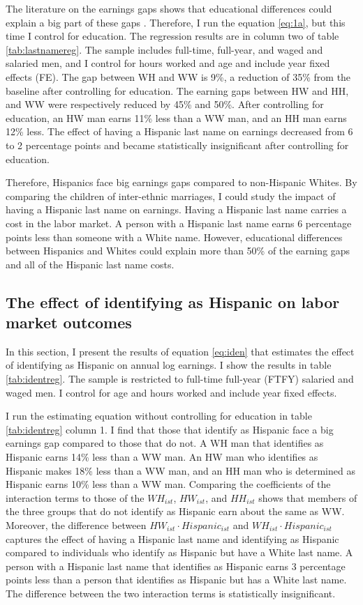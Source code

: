 \documentclass{wptemp}
\begin{document}
The literature on the earnings gaps shows that educational differences could explain a big part of these gaps \citep{duncan2006hispanics, duncan2017complexity, duncan2018identifying, duncan2020new}. Therefore, I run the equation \ref{eq:1a}, but this time I control for education. The regression results are in column two of table \ref{tab:lastnamereg}. The sample includes full-time, full-year, and waged and salaried men, and I control for hours worked and age and include year fixed effects (FE). The gap between WH and WW is 9\%, a reduction of 35\% from the baseline after controlling for education. The earning gaps between HW and HH, and WW were respectively reduced by 45\% and 50\%. After controlling for education, an HW man earns 11\% less than a WW man, and an HH man earns 12\% less. The effect of having a Hispanic last name on earnings decreased from 6 to 2 percentage points and became statistically insignificant after controlling for education.

Therefore, Hispanics face big earnings gaps compared to non-Hispanic Whites. By comparing the children of inter-ethnic marriages, I could study the impact of having a Hispanic last name on earnings. Having a Hispanic last name carries a cost in the labor market. A person with a Hispanic last name earns 6 percentage points less than someone with a White name. However, educational differences between Hispanics and Whites could explain more than 50\% of the earning gaps and all of the Hispanic last name costs.

\subsection{The effect of identifying as Hispanic on labor market outcomes}

In this section, I present the results of equation \ref{eq:iden} that estimates the effect of identifying as Hispanic on annual log earnings. I show the results in table \ref{tab:identreg}. The sample is restricted to full-time full-year (FTFY) salaried and waged men. I control for age and hours worked and include year fixed effects.

I run the estimating equation without controlling for education in table \ref{tab:identreg} column 1. I find that those that identify as Hispanic face a big earnings gap compared to those that do not. A WH man that identifies as Hispanic earns 14\% less than a WW man. An HW man who identifies as Hispanic makes 18\% less than a WW man, and an HH man who is determined as Hispanic earns 10\% less than a WW man. Comparing the coefficients of the interaction terms to those of the $WH_{ist}$, $HW_{ist}$, and $HH_{ist}$ shows that members of the three groups that do not identify as Hispanic earn about the same as WW.
Moreover, the difference between $HW_{ist} \cdot Hispanic_{ist}$  and $WH_{ist} \cdot Hispanic_{ist}$ captures the effect of having a Hispanic last name and identifying as Hispanic compared to individuals who identify as Hispanic but have a White last name. A person with a Hispanic last name that identifies as Hispanic earns 3 percentage points less than a person that identifies as Hispanic but has a White last name. The difference between the two interaction terms is statistically insignificant.
\end{document}
